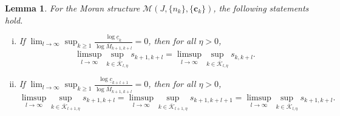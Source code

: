 \documentclass[12pt]{amsart}
\numberwithin{equation}{section}
\theoremstyle{plain}
\newtheorem{lemma}[theorem]{Lemma}
\theoremstyle{remark}
\theoremstyle{definition}
\newcommand{\ok}{\overline{\mathcal{K}}}
\newcommand{\om}{\overline{M}}
\newcommand{\ccc}{\mathbf{c}}
\newcommand{\f}{\frac}
\newcommand{\uc}{\underline{c}}
\renewcommand{\ge}{\geqslant}
\begin{document}
	\begin{lemma}\label{t=t^*}
For the Moran structure  $\mathcal{M}(J,\{n_k\},\{\ccc_k\})$, the following statements hold.
	\begin{enumerate}[(i)]
		\item If $\lim_{l\to \infty}\sup_{k\ge 1}\f{\log \uc_k}{\log \om_{k+1,k+l}}=0$, then for all $\eta>0$,
		\[
		\limsup_{l\to \infty}\sup_{k\in \ok_{l,\eta}}s_{k+1,k+l}=\limsup_{l\to \infty}\sup_{k\in \ok_{l,\eta}}s_{k,k+l}.
		\]
		\item If $\lim_{l\to \infty}\sup_{k\ge 1}\f{\log \uc_{k+l+1}}{\log \om_{k+1,k+l}}=0$, then for all $\eta>0$,
		\[
		\limsup_{l\to \infty}\sup_{k\in \ok_{l+1,\eta}}s_{k+1,k+l}=	\limsup_{l\to \infty}\sup_{k\in \ok_{l+1,\eta}}s_{k+1,k+l+1}=\limsup_{l\to \infty}\sup_{k\in \ok_{l,\eta}}s_{k+1,k+l}.
		\]
	\end{enumerate}
	\end{lemma}
\end{document}
